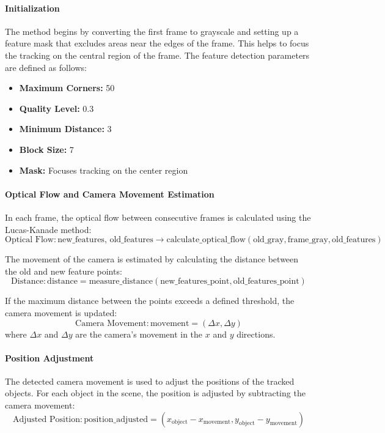 \paragraph{Initialization}
The method begins by converting the first frame to grayscale and setting up a feature mask that excludes areas near the edges of the frame. This helps to focus the tracking on the central region of the frame. The feature detection parameters are defined as follows:
\begin{itemize}
    \item \textbf{Maximum Corners:} 50
    \item \textbf{Quality Level:} 0.3
    \item \textbf{Minimum Distance:} 3
    \item \textbf{Block Size:} 7
    \item \textbf{Mask:} Focuses tracking on the center region
\end{itemize}

\paragraph{Optical Flow and Camera Movement Estimation}
In each frame, the optical flow between consecutive frames is calculated using the Lucas-Kanade method:
\begin{equation}
    \text{Optical Flow:} \, \text{new\_features}, \, \text{old\_features} \rightarrow \text{calculate\_optical\_flow}(\text{old\_gray}, \text{frame\_gray}, \text{old\_features})
\end{equation}

The movement of the camera is estimated by calculating the distance between the old and new feature points:
\begin{equation}
    \text{Distance:} \, \text{distance} = \text{measure\_distance}(\text{new\_features\_point}, \text{old\_features\_point})
\end{equation}

If the maximum distance between the points exceeds a defined threshold, the camera movement is updated:
\begin{equation}
    \text{Camera Movement:} \, \text{movement} = (\Delta x, \Delta y)
\end{equation}
where $\Delta x$ and $\Delta y$ are the camera's movement in the $x$ and $y$ directions.

\paragraph{Position Adjustment}
The detected camera movement is used to adjust the positions of the tracked objects. For each object in the scene, the position is adjusted by subtracting the camera movement:
\begin{equation}
    \text{Adjusted Position:} \, \text{position\_adjusted} = (x_{\text{object}} - x_{\text{movement}}, y_{\text{object}} - y_{\text{movement}})
\end{equation}

